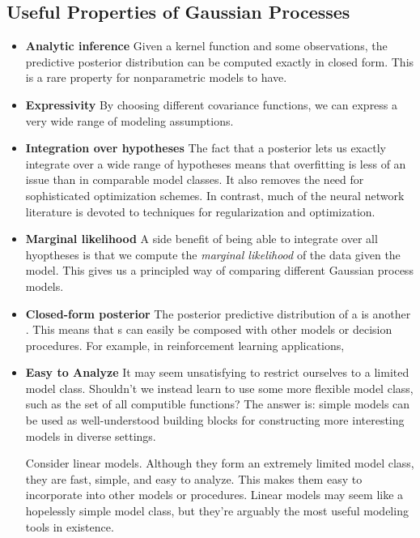 \subsection{Useful Properties of Gaussian Processes}

\begin{itemize}

\item {\bf Analytic inference}
Given a kernel function and some observations, the predictive posterior distribution can be computed exactly in closed form.  This is a rare property for nonparametric models to have.

\item {\bf Expressivity}
By choosing different covariance functions, we can express a very wide range of modeling assumptions.

\item {\bf Integration over hypotheses}
The fact that a \gp{} posterior lets us exactly integrate over a wide range of hypotheses means that overfitting is less of an issue than in comparable model classes.
It also removes the need for sophisticated optimization schemes.
%
In contrast, much of the neural network literature is devoted to techniques for regularization and optimization.

\item {\bf Marginal likelihood}
A side benefit of being able to integrate over all hyoptheses is that we compute the \emph{marginal likelihood} of the data given the model.
This gives us a principled way of comparing different Gaussian process models.

\item {\bf Closed-form posterior}
The posterior predictive distribution of a \gp{} is another \gp{}.
This means that \gp{}s can easily be composed with other models or decision procedures.
For example, in reinforcement learning applications, 

\item {\bf Easy to Analyze}
It may seem unsatisfying to restrict ourselves to a limited model class.
Shouldn't we instead learn to use some more flexible model class, such as the set of all computible functions?
The answer is: simple models can be used as well-understood building blocks for constructing more interesting models in diverse settings.

Consider linear models.
Although they form an extremely limited model class, they are fast, simple, and easy to analyze.
This makes them easy to incorporate into other models or procedures.
Linear models may seem like a hopelessly simple model class, but they're arguably the most useful modeling tools in existence.

\end{itemize}




